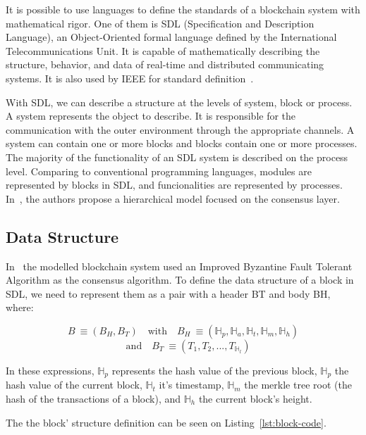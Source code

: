 \documentclass[sigconf, nonacm]{acmart}
\begin{document}
It is possible to use languages to define the standards of a blockchain system with mathematical rigor.
One of them is SDL (Specification and Description Language), an Object-Oriented formal language defined by the International Telecommunications Unit.
It is capable of mathematically describing the structure, behavior, and data of real-time and distributed communicating systems. 
It is also used by IEEE for standard definition~\cite{Duan2018}.

With SDL, we can describe a structure at the levels of system, block or process. A system represents the object to describe. 
It is responsible for the communication with the outer environment through the appropriate channels.
A system can contain one or more blocks and blocks contain one or more processes.
The majority of the functionality of an SDL system is described on the process level.
Comparing to conventional programming languages, modules are represented by blocks in SDL, and funcionalities are represented by processes.
In~\cite{Duan2018}, the authors propose a hierarchical model focused on the consensus layer.

  \subsection{Data Structure}
  In~\cite{Duan2018} the modelled blockchain system used an Improved Byzantine Fault Tolerant Algorithm as the consensus algorithm.
  To define the data structure of a block in SDL, we need to represent them as a pair with a header BT and body BH, where:

  \begin{displaymath}
    B~\equiv(B_H,B_T) \quad \textrm{with} \quad B_H~\equiv(\mathbb{H}_p,\mathbb{H}_a,\mathbb{H}_t,\mathbb{H}_m,\mathbb{H}_h) 
  \end{displaymath}
  \begin{displaymath}
    \quad \textrm{and} \quad B_T~\equiv(T_1,T_2,...,T_{\mathbb{H}_l}) 
  \end{displaymath}
  \linebreak[1]

  In these expressions, $\mathbb{H}_p$ represents the hash value of the previous block, 
  $\mathbb{H}_p$ the hash value of the current block, $\mathbb{H}_t$ it's timestamp, 
  $\mathbb{H}_m$ the merkle tree root (the hash of the transactions of a block), and $\mathbb{H}_h$ the current block's height.

  The the block' structure definition can be seen on Listing~\ref{lst:block-code}.
  
\end{document}
